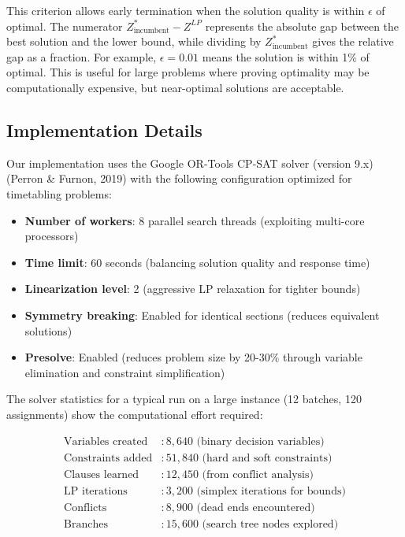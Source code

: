 \documentclass[12pt,a4paper]{article}
\begin{document}
This criterion allows early termination when the solution quality is within $\epsilon$ of optimal. The numerator $Z^*_{\text{incumbent}} - Z^{LP}$ represents the absolute gap between the best solution and the lower bound, while dividing by $Z^*_{\text{incumbent}}$ gives the relative gap as a fraction. For example, $\epsilon = 0.01$ means the solution is within 1\% of optimal. This is useful for large problems where proving optimality may be computationally expensive, but near-optimal solutions are acceptable.

\subsection{Implementation Details}

Our implementation uses the Google OR-Tools CP-SAT solver (version 9.x) (Perron \& Furnon, 2019) with the following configuration optimized for timetabling problems:

\begin{itemize}
\item \textbf{Number of workers}: 8 parallel search threads (exploiting multi-core processors)
\item \textbf{Time limit}: 60 seconds (balancing solution quality and response time)
\item \textbf{Linearization level}: 2 (aggressive LP relaxation for tighter bounds)
\item \textbf{Symmetry breaking}: Enabled for identical sections (reduces equivalent solutions)
\item \textbf{Presolve}: Enabled (reduces problem size by 20-30\% through variable elimination and constraint simplification)
\end{itemize}

The solver statistics for a typical run on a large instance (12 batches, 120 assignments) show the computational effort required:

\begin{align}
\text{Variables created} &: 8{,}640 \text{ (binary decision variables)} \\
\text{Constraints added} &: 51{,}840 \text{ (hard and soft constraints)} \\
\text{Clauses learned} &: 12{,}450 \text{ (from conflict analysis)} \\
\text{LP iterations} &: 3{,}200 \text{ (simplex iterations for bounds)} \\
\text{Conflicts} &: 8{,}900 \text{ (dead ends encountered)} \\
\text{Branches} &: 15{,}600 \text{ (search tree nodes explored)}
\end{align}
\end{document}
